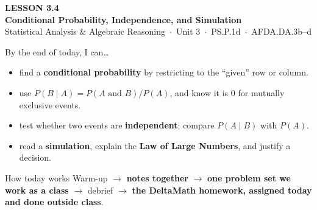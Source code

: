 \documentclass[aspectratio=169, 11pt]{beamer}
\begin{document}
{
\begin{frame}[plain]
  \vspace{2.4cm}\hspace{0.55cm}%
  \begin{minipage}{0.9\textwidth}
    {\color{goldacc}\bfseries\small LESSON 3.4}\\[0.5cm]
    {\color{white}\bfseries\LARGE Conditional Probability, Independence, and Simulation}\\[1.0cm]
    {\color{frostmid}\small Statistical Analysis \& Algebraic Reasoning~$\cdot$~Unit 3~$\cdot$~PS.P.1d~$\cdot$~AFDA.DA.3b--d}
  \end{minipage}
\end{frame}
}

\begin{frame}[t, plain]
  By the end of today, I can\ldots
  \begin{itemize}\setlength{\itemsep}{4pt}
    \item find a \textbf{conditional probability} by restricting to the ``given'' row or column.
    \item use $P(B \mid A) = P(A \text{ and } B)/P(A)$, and know it is $0$ for mutually exclusive events.
    \item test whether two events are \textbf{independent}: compare $P(A \mid B)$ with $P(A)$.
    \item read a \textbf{simulation}, explain the \textbf{Law of Large Numbers}, and justify a decision.
  \end{itemize}
  \begin{block}{How today works}
    Warm-up $\to$ \textbf{notes together} $\to$ \textbf{one problem set we work as a class} $\to$
    debrief $\to$ \textbf{the DeltaMath homework, assigned today and done outside class}.
  \end{block}
\end{frame}
\end{document}
